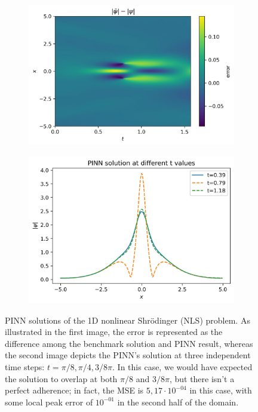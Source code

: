 \documentclass[pdflatex,sn-basic]{sn-jnl}%
\theoremstyle{thmstyleone}%
\theoremstyle{thmstyletwo}%
\theoremstyle{thmstylethree}%
\begin{document}
\begin{figure}[hbt!]
     \centering
     \begin{subfigure}[b]{0.49\textwidth}
         \centering
         \includegraphics[width=\textwidth]{diff_hs100}
     \end{subfigure}
     \hfill
     \begin{subfigure}[b]{0.49\textwidth}
         \centering
         \includegraphics[width=\textwidth]{PINN_Timings50}
     \end{subfigure}
        \caption{PINN solutions of the 1D nonlinear Shr\"{o}dinger (NLS) problem.
        As illustrated in the first image, the error is represented as the difference among the benchmark solution and PINN result, whereas the second image depicts the PINN's solution at three independent time steps: $t=\pi/8, \pi/4 , 3/8\pi$.
        In this case, we would have expected the solution to overlap at both $\pi/8$ and $ 3/8\pi$, but there isn't a perfect adherence; in fact, the MSE is $5,17\cdot 10^{-04}$ in this case, with some local peak error of $10^{-01}$ in the second half of the domain.
        }
        \label{fig:PINN_best_sol}
\end{figure}
\end{document}
